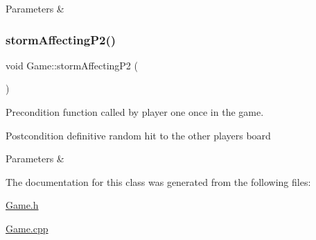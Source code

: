 \begin{DoxyParams}{Parameters}
{\em } & \\
\hline
\end{DoxyParams}
\mbox{\label{classGame_aa8be6f3ccad3ea9c05096f3aee6c3b89}} 
\subsubsection{\texorpdfstring{storm\+Affecting\+P2()}{stormAffectingP2()}}
{\footnotesize\ttfamily void Game\+::storm\+Affecting\+P2 (\begin{DoxyParamCaption}{ }\end{DoxyParamCaption})}

\begin{DoxyPrecond}{Precondition}
function called by player one once in the game. 
\end{DoxyPrecond}
\begin{DoxyPostcond}{Postcondition}
definitive random hit to the other player\textquotesingle{}s board 
\end{DoxyPostcond}

\begin{DoxyParams}{Parameters}
{\em } & \\
\hline
\end{DoxyParams}


The documentation for this class was generated from the following files\+:\begin{DoxyCompactItemize}
\item 
\hyperlink{Game_8h}{Game.\+h}\item 
\hyperlink{Game_8cpp}{Game.\+cpp}\end{DoxyCompactItemize}
